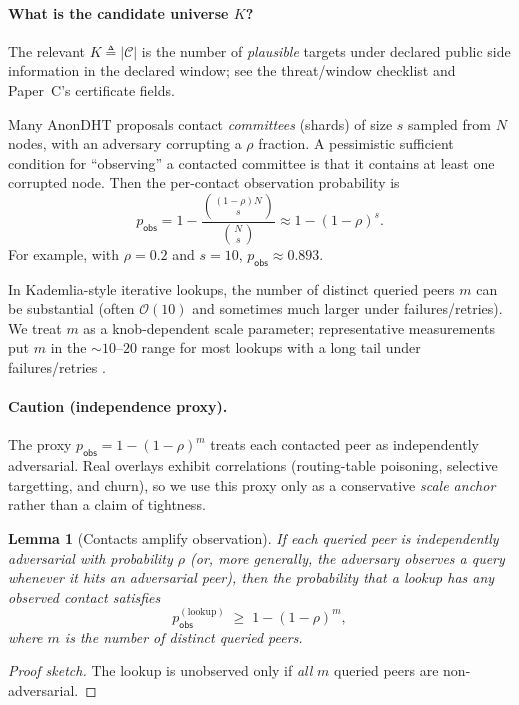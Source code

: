 \documentclass[11pt]{article}
\newcommand{\C}{\mathcal{C}} %
\newtheorem{lemma}{Lemma}
\begin{document}
\paragraph{What is the candidate universe $K$?}
The relevant $K\triangleq|\C|$ is the number of \emph{plausible} targets under declared public side information in the declared window; see the threat/window checklist \cite{series:threatwindows} and Paper~C's certificate fields.

Many AnonDHT proposals contact \emph{committees} (shards) of size $s$ sampled from $N$ nodes, with an adversary corrupting a $\rho$ fraction.
A pessimistic sufficient condition for ``observing'' a contacted committee is that it contains at least one corrupted node.
Then the per-contact observation probability is
\begin{equation}\label{eq:pobs_committee}
p_{\mathsf{obs}}
= 1- \frac{\binom{(1-\rho)N}{s}}{\binom{N}{s}}
\approx 1-(1-\rho)^s.
\end{equation}
For example, with $\rho=0.2$ and $s=10$, $p_{\mathsf{obs}}\approx 0.893$.


In Kademlia-style iterative lookups, the number of distinct queried peers $m$ can be substantial (often $\mathcal O(10)$ and sometimes much larger under failures/retries).
We treat $m$ as a knob-dependent scale parameter; representative measurements put $m$ in the $\sim 10$--$20$ range for most lookups with a long tail under failures/retries \cite{ipfs_kad_spec,cortes2024kadlimits,probelab_rfm17,trautwein2024ipfs}.

\paragraph{Caution (independence proxy).} The proxy $p_{\mathsf{obs}}=1-(1-\rho)^m$ treats each contacted peer as independently adversarial. Real overlays exhibit correlations (routing-table poisoning, selective targetting, and churn), so we use this proxy only as a conservative \emph{scale anchor} rather than a claim of tightness.






\begin{lemma}[Contacts amplify observation]\label{lem:contacts_amplify}
If each queried peer is independently adversarial with probability $\rho$ (or, more generally, the adversary observes a query whenever it hits an adversarial peer), then the probability that a lookup has \emph{any} observed contact satisfies
\[
p_{\mathsf{obs}}^{(\mathrm{lookup})}\;\ge\; 1-(1-\rho)^m,
\]
where $m$ is the number of distinct queried peers.
\end{lemma}
\begin{proof}[Proof sketch]
The lookup is unobserved only if \emph{all} $m$ queried peers are non-adversarial.
\end{proof}
\end{document}
